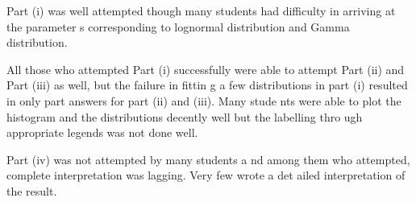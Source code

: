 \documentclass[a4paper,12pt]{article}
\begin{document}
\newpage 
Part (i) was well attempted though many students had difficulty in arriving at the parameter
s corresponding to lognormal distribution and Gamma distribution. 

All those who attempted
Part (i) successfully were able to attempt Part (ii) and Part (iii) as well, but the failure in fittin
g a few distributions in part (i) resulted in only part answers for part (ii) and (iii). Many stude
nts were able to plot the histogram and the distributions decently well but the labelling thro
ugh appropriate legends was not done well. 

Part (iv) was not attempted by many students a
nd among them who attempted, complete interpretation was lagging. Very few wrote a det
ailed interpretation of the result.
\end{document}
